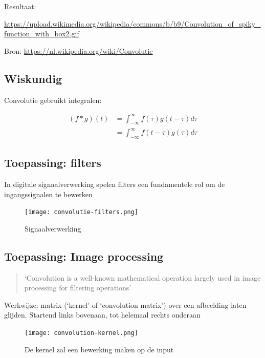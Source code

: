 \documentclass{article}
\begin{document}
Resultaat: 

\url{https://upload.wikimedia.org/wikipedia/commons/b/b9/Convolution_of_spiky_function_with_box2.gif}

Bron: \url{https://nl.wikipedia.org/wiki/Convolutie}

\subsection{Wiskundig}

Convolutie gebruikt integralen:

\begin{equation}
    \begin{aligned}
        (f * g)(t) &= \int_{-\infty}^{\infty} f(\tau) g(t-\tau) d{\tau}\\
        &= \int_{-\infty}^{\infty} f(t - \tau) g (\tau) d{\tau}
    \end{aligned}
\end{equation}


\subsection{Toepassing: filters}

In digitale signaalverwerking spelen filters een fundamentele rol om de ingangssignalen te bewerken

\begin{figure}[H]
    \centering
    \texttt{[image: convolutie-filters.png]}
    \caption{Signaalverwerking}
\end{figure}

\subsection{Toepassing: Image processing}

\begin{quote}
    `Convolution is a well-known mathematical operation largely used in
image processing for filtering operations'
\end{quote}

Werkwijze: matrix (`kernel' of `convolution matrix') over een afbeelding laten glijden.
Startend links bovenaan, tot helemaal rechts onderaan

\begin{figure}[H]
    \centering
    \texttt{[image: convolution-kernel.png]}
    \caption{De kernel zal een bewerking maken op de input}
\end{figure}
\end{document}
